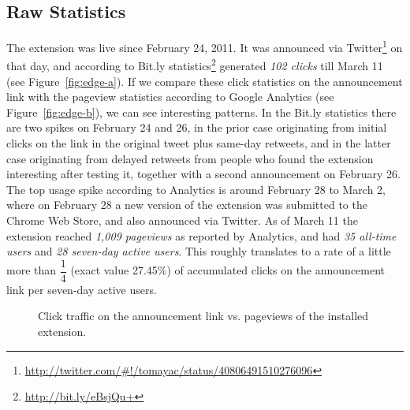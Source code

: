 \documentclass[runningheads,a4paper]{llncs}
\begin{document}
\subsection{Raw Statistics}
The extension was live since February 24, 2011. It was announced via Twitter\footnote{\url{http://twitter.com/#!/tomayac/status/40806491510276096}} on that day, and according to Bit.ly statistics\footnote{\url{http://bit.ly/eBsjQu+}} generated \textit{102 clicks} till March 11 (see Figure~\ref{fig:edge-a}). If we compare these click statistics on the announcement link with the pageview statistics according to Google Analytics (see Figure~\ref{fig:edge-b}), we can see interesting patterns. In the Bit.ly statistics there are two spikes on February 24 and 26, in the prior case originating from initial clicks on the link in the original tweet plus same-day retweets, and in the latter case originating from delayed retweets from people who found the extension interesting after testing it, together with a second announcement on February 26. The top usage spike according to Analytics is around February 28 to March 2, where on February 28 a new version of the extension was submitted to the Chrome Web Store, and also announced via Twitter. As of March 11 the extension reached \textit{1,009 pageviews} as reported by Analytics, and had \textit{35 all-time users} and \textit{28 seven-day active users}. This roughly translates to a rate of a little more than $\dfrac{1}{4}$ (exact value 27.45\%) of accumulated clicks on the announcement link per seven-day active users.

\begin{figure}[htp]
  \begin{center}
  \end{center}
  \caption{Click traffic on the announcement link vs. pageviews of the installed extension.}
  \label{fig:traffic}
\end{figure}
\end{document}
